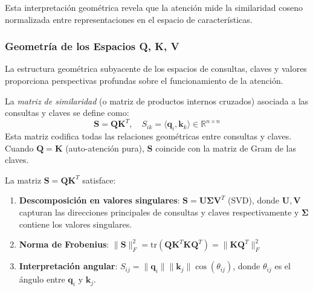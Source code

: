 Esta interpretación geométrica revela que la atención mide la similaridad coseno normalizada entre representaciones en el espacio de características.

\subsubsection{Geometría de los Espacios Q, K, V}

La estructura geométrica subyacente de los espacios de consultas, claves y valores proporciona perspectivas profundas sobre el funcionamiento de la atención.

\begin{definition}\label{def:gram_metric_attention}
    La \textit{matriz de similaridad} (o matriz de productos internos cruzados) asociada a las consultas y claves se define como:
    \begin{equation}
        \mathbf{S} = \mathbf{Q}\mathbf{K}^T, \quad S_{ik} = \langle \mathbf{q}_i, \mathbf{k}_k \rangle \in \mathbb{R}^{n \times n}
        \label{eq:gram_matrix_attention}
    \end{equation}
    Esta matriz codifica todas las relaciones geométricas entre consultas y claves. Cuando $\mathbf{Q} = \mathbf{K}$ (auto-atención pura), $\mathbf{S}$ coincide con la matriz de Gram de las claves.
\end{definition}

\begin{proposition}\label{prop:geometric_properties_gram}
    La matriz $\mathbf{S} = \mathbf{Q}\mathbf{K}^T$ satisface:
    \begin{enumerate}
        \item \textbf{Descomposición en valores singulares}: $\mathbf{S} = \mathbf{U}\mathbf{\Sigma}\mathbf{V}^T$ (SVD), donde $\mathbf{U}, \mathbf{V}$ capturan las direcciones principales de consultas y claves respectivamente y $\mathbf{\Sigma}$ contiene los valores singulares.
        \item \textbf{Norma de Frobenius}: $\|\mathbf{S}\|_F^2 = \text{tr}(\mathbf{Q}\mathbf{K}^T\mathbf{K}\mathbf{Q}^T) = \|\mathbf{K}\mathbf{Q}^T\|_F^2$
        \item \textbf{Interpretación angular}: $S_{ij} = \|\mathbf{q}_i\|\|\mathbf{k}_j\|\cos(\theta_{ij})$, donde $\theta_{ij}$ es el ángulo entre $\mathbf{q}_i$ y $\mathbf{k}_j$.
    \end{enumerate}
\end{proposition}


